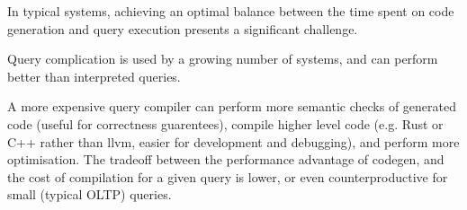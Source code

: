 \documentclass[conference]{IEEEtran}
\begin{document}

In typical systems, achieving an optimal balance between the time spent on code generation and query
execution presents a significant challenge.

Query complication is used by a growing number of systems, and can perform better than interpreted queries.

A more expensive query compiler can perform more semantic checks of generated
code (useful for correctness guarentees), compile higher level code (e.g. Rust or C++ rather than llvm, easier for development and debugging),
and perform more optimisation. The tradeoff between the performance advantage of codegen, and
the cost of compilation for a given query is lower, or even counterproductive for
small (typical OLTP) queries.

\end{document}
